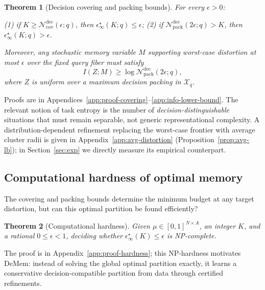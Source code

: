 \documentclass{article}
\theoremstyle{plain}
\newtheorem{theorem}{Theorem}
\theoremstyle{definition}
\theoremstyle{remark}
\newcommand{\cX}{\mathcal{X}}
\newcommand{\cN}{\mathcal{N}}
\newcommand{\eps}{\epsilon}
\begin{document}
\begin{theorem}[Decision covering and packing bounds]
\label{thm:cover-pack}
For every \(\eps>0\):

(1) if \(K\ge \cN^{\mathrm{dec}}_{\mathrm{cov}}(\eps;q)\), then
\(\eps^\star_\infty(K;q)\le \eps\);
(2) if \(\cN^{\mathrm{dec}}_{\mathrm{pack}}(2\eps;q)>K\), then
\(\eps^\star_\infty(K;q)>\eps\).

Moreover, any stochastic memory variable \(M\) supporting worst-case
distortion at most \(\eps\) over the fixed query fiber must satisfy
\[
I(Z;M) \ge \log \cN^{\mathrm{dec}}_{\mathrm{pack}}(2\eps;q),
\]
where \(Z\) is uniform over a maximum decision packing in \(\cX_q\).
\end{theorem}

\noindent Proofs are in Appendices~\ref{app:proof-covering}--\ref{app:info-lower-bound}.
The relevant notion of task entropy is the number of \emph{decision-distinguishable} situations that must remain separable, not generic representational complexity.
A distribution-dependent refinement replacing the worst-case frontier with average cluster radii is given in Appendix~\ref{app:avg-distortion} (Proposition~\ref{prop:avg-lb}); in Section~\ref{sec:exp} we directly measure its empirical counterpart.

\vspace{-0.5em}
\subsection{Computational hardness of optimal memory}
\label{sec:hardness}
\vspace{-0.5em}
The covering and packing bounds determine the minimum budget at any target distortion, but can this optimal partition be found efficiently?
\begin{theorem}[Computational hardness]
\label{thm:np-hard}
Given $\mu\in[0,1]^{N\times A}$, an integer $K$, and a rational
$0\le \eps < 1$, deciding whether $\eps^\star_\infty(K)\le\eps$ is
\textup{NP}-complete.
\end{theorem}

\noindent The proof is in Appendix~\ref{app:proof-hardness}; this NP-hardness motivates DeMem: instead of solving the global optimal
partition exactly, it learns a conservative decision-compatible partition
from data through certified refinements.

\vspace{-0.5em}
\end{document}
